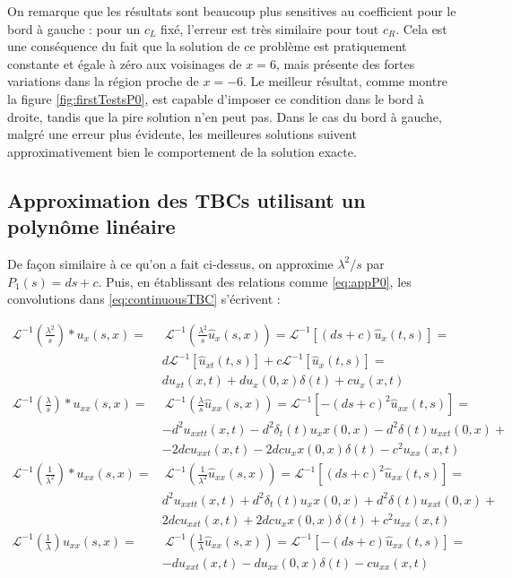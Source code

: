 \indent On remarque que les résultats sont beaucoup plus sensitives au coefficient pour le bord à gauche : pour un $c_L$ fixé, l'erreur est très similaire pour tout $c_R$. Cela est une conséquence du fait que la solution de ce problème est pratiquement constante et égale à zéro aux voisinages de $x = 6$, mais présente des fortes variations dans la région proche de  $x = -6$. Le meilleur résultat, comme montre la figure \ref{fig:firstTestsP0}, est capable d'imposer ce condition dans le bord à droite, tandis que la pire solution n'en peut pas. Dans le cas du bord à gauche, malgré une erreur plus évidente, les meilleures solutions suivent approximativement bien le comportement de la solution exacte.

\subsection{Approximation des TBCs utilisant un polynôme linéaire}

\indent De façon similaire à ce qu'on a fait ci-dessus, on approxime $\lambda^2/s$ par $P_1(s) = ds + c$. Puis, en établissant des relations comme \eqref{eq:appP0}, les convolutions dans \eqref{eq:continuousTBC} s'écrivent :

\begin{equation*}
	\begin{aligned}
    \mathcal{L}^{-1} \left( \frac{\lambda^2}{s}\right) *  u_x(s,x)   =  & \  \mathcal{L}^{-1} \left( \frac{\lambda^2}{s} \hat{u}_x(s,x) \right) =  \mathcal{L}^{-1} \left[ (ds+c) \hat{u}_x(t,s) \right] = \\
    			 & d\mathcal{L}^{-1} \left[ \hat{u}_{xt}(t,s) \right] + c \mathcal{L}^{-1} \left[ \hat{u}_{x}(t,s) \right] = \\
    			 &   du_{xt}(x,t) + du_x(0,x)\delta (t) + cu_x(x,t) \\
    \mathcal{L}^{-1} \left( \frac{\lambda}{s} \right) * u_{xx}(s,x)  = & \   \mathcal{L}^{-1} \left( \frac{\lambda}{s} \hat{u}_{xx}(s,x) \right) =  \mathcal{L}^{-1} \left[ -(ds+c)^2 \hat{u}_{xx}(t,s) \right] =\\
    			&  -d^2u_{xxtt}(x,t) - d^2\delta_t(t) u_xx(0,x) - d^2 \delta(t)u_{xxt}(0,x)  + \\ 
    			& - 2dcu_{xxt}(x,t) -  2dcu_xx(0,x)\delta (t) - c^2u_{xx}(x,t) \\
     \mathcal{L}^{-1} \left( \frac{1}{\lambda^2} \right) * u_{xx}(s,x)  = & \  \mathcal{L}^{-1} \left( \frac{1}{\lambda^2} \hat{u}_{xx}(s,x) \right) = \mathcal{L}^{-1} \left[ (ds+c)^2 \hat{u}_{xx}(t,s) \right] = \\
    			& d^2u_{xxtt}(x,t) + d^2\delta_t(t) u_xx(0,x) + d^2 \delta(t)u_{xxt}(0,x)  + \\
    			& 2dcu_{xxt}(x,t) +  2dcu_xx(0,x)\delta (t) + c^2u_{xx}(x,t) \\
     \mathcal{L}^{-1} \left( \frac{1}{\lambda} \right) u_{xx}(s,x) = & \  \mathcal{L}^{-1} \left( \frac{1}{\lambda} \hat{u}_{xx}(s,x) \right) = \mathcal{L}^{-1} \left[ -(ds+c) \hat{u}_{xx}(t,s) \right] = \\
    			& -du_{xxt}(x,t) - du_{xx}(0,x)\delta (t) - cu_{xx}(x,t)
\end{aligned}
\end{equation*}

